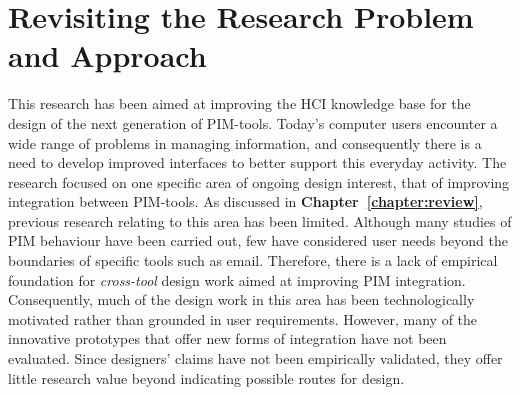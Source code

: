 \section{Revisiting the Research Problem and Approach}
\label{conclusion:recap}

This research has been aimed at improving the HCI knowledge base for the design of the next generation of PIM-tools.  Today's computer users encounter a wide range of problems in managing information, and consequently there is a need to develop improved interfaces to better support this everyday activity.
The research focused on one specific area of ongoing design interest, that of improving integration between PIM-tools.  As discussed in \textbf{Chapter~\ref{chapter:review}}, previous research relating to this area has been limited.  Although many studies of PIM behaviour have been carried out, few have considered user needs beyond the boundaries of specific tools such as email.  Therefore, there is a lack of empirical foundation for \textit{cross-tool} design work aimed at improving PIM integration.  Consequently, much of the design work in this area has been technologically motivated rather than grounded in user requirements.  However, many of the innovative prototypes that offer new forms of integration have not been evaluated.  Since designers' claims have not been empirically validated, they offer little research value beyond indicating possible routes for design.  %

